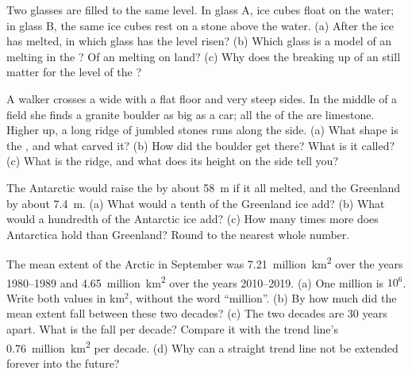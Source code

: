 \begin{exercise}[$\star\star$]\label{exo:g8:ice-on-earth:8}
Two glasses are filled to the same level. In glass A, ice cubes float on
the water; in glass B, the same ice cubes rest on a stone above the
water. (a) After the ice has melted, in which glass has the level risen?
(b) Which glass is a model of an  melting in the ? Of an  melting on land? (c) Why does the breaking up of an 
still matter for the level of the ?
\end{exercise}

\begin{exercise}[$\star\star$]\label{exo:g8:ice-on-earth:9}
A walker crosses a wide  with a flat floor and very steep sides. In
the middle of a field she finds a granite boulder as big as a car; all the
 of the  are limestone. Higher up, a long ridge of jumbled
stones runs along the  side. (a) What shape is the , and what
carved it? (b) How did the boulder get there? What is it called? (c) What
is the ridge, and what does its height on the  side tell you?
\end{exercise}

\begin{exercise}[$\star\star$]\label{exo:g8:ice-on-earth:10}
The Antarctic  would raise the  by about \qty{58}{m} if it
all melted, and the Greenland  by about \qty{7.4}{m}. (a) What
would a tenth of the Greenland ice add? (b) What would a hundredth of the
Antarctic ice add? (c) How many times more does Antarctica hold than
Greenland? Round to the nearest whole number.
\end{exercise}

\begin{exercise}[$\star\star\star$]\label{exo:g8:ice-on-earth:11}
The mean extent of the Arctic  in September was
\num{7.21}~million~\unit{km^2} over the years 1980--1989 and
\num{4.65}~million~\unit{km^2} over the years 2010--2019. (a) One million is
$10^6$. Write both values in km$^2$, without the word ``million''.
(b) By how much did the mean extent fall between these two decades?
(c) The two decades are 30 years apart. What is the fall per decade?
Compare it with the trend line's \num{0.76}~million~\unit{km^2} per decade.
(d) Why can a straight trend line not be extended forever into the
future?
\end{exercise}

